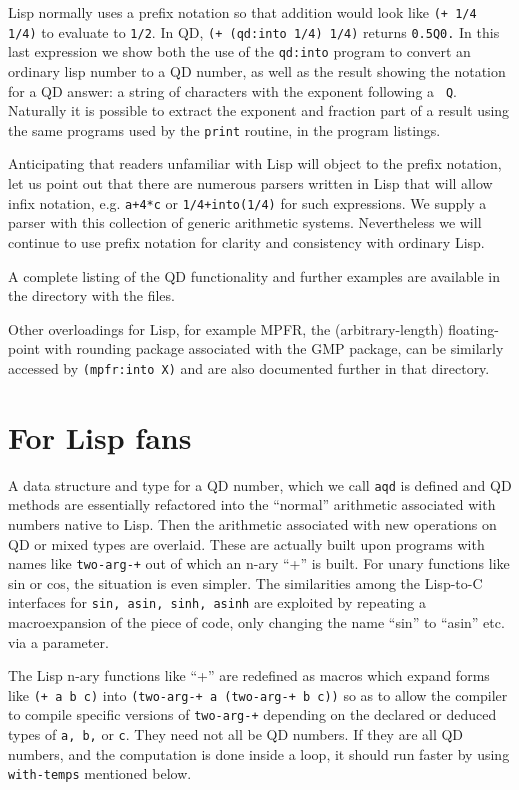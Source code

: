 \documentclass{article}
\begin{document}
Lisp normally uses a prefix notation so that addition would look like
{\tt (+ 1/4 1/4)} to evaluate to {\tt 1/2}.  In QD, {\tt (+ (qd:into
1/4) 1/4)} returns {\tt 0.5Q0.}  In this last expression we show both
the use of the {\tt qd:into} program to convert an ordinary lisp
number to a QD number, as well as the result showing the notation for
a QD answer: a string of characters with the exponent following a {\tt
Q}. Naturally it is possible to extract the exponent and fraction part
of a result using the same programs used by the {\tt print} routine,
in the program listings.

Anticipating that readers unfamiliar with Lisp will object to the
prefix notation, let us point out that there are numerous parsers
written in Lisp that will allow infix notation, e.g. {\tt a+4*c} or
{\tt 1/4+into(1/4)} for such expressions. We supply a parser with this
collection of generic arithmetic systems. Nevertheless we will continue to use
prefix notation for clarity and consistency with ordinary Lisp.

A complete listing of the QD functionality and further examples are
available in the directory with the files.

Other overloadings for Lisp, for example MPFR, the (arbitrary-length)
floating-point with rounding package associated with the GMP package,
can be similarly accessed by {\tt (mpfr:into X)} and are also documented
further in that directory. 

\section{For Lisp fans}
A data structure and type for a QD number, which we call {\tt aqd} is
defined and QD methods are essentially refactored into the ``normal''
arithmetic associated with numbers native to Lisp. Then the arithmetic
associated with new operations on QD or mixed types are overlaid.
These are actually built upon programs with names like {\tt two-arg-+}
out of which an n-ary ``+'' is built.  For unary functions like sin or
cos, the situation is even simpler.  
The similarities among
the Lisp-to-C interfaces for {\tt sin, asin, sinh, asinh} are exploited by
repeating a macroexpansion of the piece of code, only changing
the name ``sin'' to ``asin'' etc. via a parameter. 

The Lisp n-ary functions like ``+'' are redefined as macros which expand
forms like {\tt (+ a b c)} into {\tt (two-arg-+ a (two-arg-+ b c))} so as to
allow the compiler to compile specific versions of {\tt two-arg-+} depending
on the declared or deduced types of {\tt a, b,} or {\tt c}. They need not all be QD
numbers.  If they are all QD numbers, and the computation is done inside a loop,
it should run faster by using {\tt with-temps} mentioned below.
\end{document}
